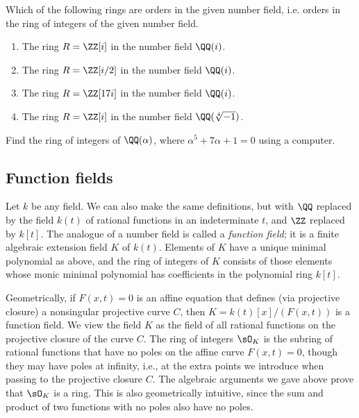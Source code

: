 \begin{exercise}
  Which of the following rings are orders in the given
  number field, i.e. orders in the ring of integers of the
  given number field.
  \begin{enumerate}[label=(\alph*)]
    \item The ring $R = \ZZ[i]$ in the number field $\QQ(i)$.
    \item The ring $R = \ZZ[i/2]$ in the number field $\QQ(i)$.
    \item The ring $R = \ZZ[17i]$ in the number field $\QQ(i)$.
    \item The ring $R = \ZZ[i]$ in the number field $\QQ(\sqrt[4]{-1})$.
  \end{enumerate}
\end{exercise}

\begin{exercise}
  Find the ring of integers of $\QQ(\alpha)$, where $\alpha^5 + 7\alpha + 1 = 0$
  using a computer.
\end{exercise}

\subsection{Function fields}
Let $k$ be any field.  We can also make the same definitions, but with $\QQ$
replaced by the field $k(t)$ of rational functions in an indeterminate
$t$, and $\ZZ$ replaced by $k[t]$.
The analogue of a number field is called a {\em function field}; it is
a finite algebraic extension field $K$ of $k(t)$.  Elements of $K$
have a unique minimal polynomial as above, and the ring of integers of
$K$ consists of those elements whose monic minimal polynomial has
coefficients in the polynomial ring $k[t]$.

Geometrically, if $F(x,t)=0$ is an affine equation that defines (via
projective closure) a nonsingular projective curve $C$, then
$K=k(t)[x]/(F(x,t))$ is a function field.  We view the field $K$ as
the field of all rational functions on the projective closure of the
curve $C$.  The ring of integers $\sO_K$ is the subring of rational
functions that have no poles on the affine curve $F(x,t)=0$, though
they may have poles at infinity, i.e., at the extra points we
introduce when passing to the projective closure $C$.  The algebraic
arguments we gave above prove that $\sO_K$ is a ring.  This is also
geometrically intuitive, since the sum and product of two functions
with no poles also have no poles.

